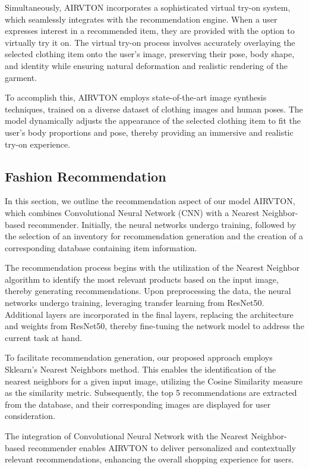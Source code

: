 	Simultaneously, AIRVTON incorporates a sophisticated virtual try-on system, which seamlessly integrates with the recommendation engine. When a user expresses interest in a recommended item, they are provided with the option to virtually try it on. The virtual try-on process involves accurately overlaying the selected clothing item onto the user's image, preserving their pose, body shape, and identity while ensuring natural deformation and realistic rendering of the garment.

	To accomplish this, AIRVTON employs state-of-the-art image synthesis techniques, trained on a diverse dataset of clothing images and human poses. The model dynamically adjusts the appearance of the selected clothing item to fit the user's body proportions and pose, thereby providing an immersive and realistic try-on experience.

\subsection{Fashion Recommendation}
	In this section, we outline the recommendation aspect of our model AIRVTON, which combines Convolutional Neural Network (CNN) with a Nearest Neighbor-based recommender. Initially, the neural networks undergo training, followed by the selection of an inventory for recommendation generation and the creation of a corresponding database containing item information.

	The recommendation process begins with the utilization of the Nearest Neighbor algorithm to identify the most relevant products based on the input image, thereby generating recommendations. Upon preprocessing the data, the neural networks undergo training, leveraging transfer learning from ResNet50. Additional layers are incorporated in the final layers, replacing the architecture and weights from ResNet50, thereby fine-tuning the network model to address the current task at hand.

	To facilitate recommendation generation, our proposed approach employs Sklearn's Nearest Neighbors method. This enables the identification of the nearest neighbors for a given input image, utilizing the Cosine Similarity measure as the similarity metric. Subsequently, the top 5 recommendations are extracted from the database, and their corresponding images are displayed for user consideration.

	The integration of Convolutional Neural Network with the Nearest Neighbor-based recommender enables AIRVTON to deliver personalized and contextually relevant recommendations, enhancing the overall shopping experience for users.


